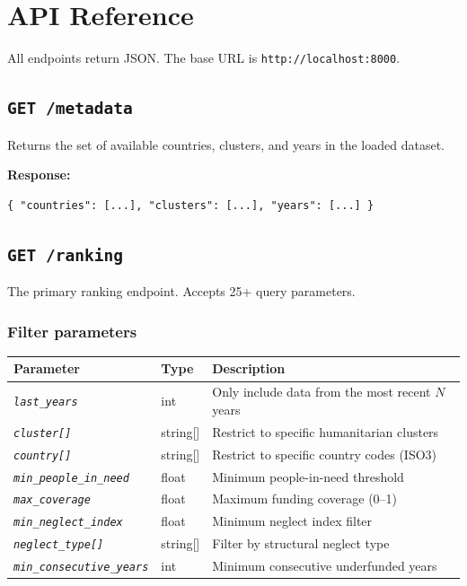 \documentclass[11pt,a4paper]{article}
\newcommand{\code}[1]{\texttt{#1}}
\newcommand{\apiendpoint}[1]{\texttt{\textcolor{ocha-blue}{#1}}}
\newcommand{\param}[1]{\texttt{\textit{#1}}}
\begin{document}
\section{API Reference}

All endpoints return JSON.  The base URL is \code{http://localhost:8000}.

\subsection{\apiendpoint{GET /metadata}}

Returns the set of available countries, clusters, and years in the loaded dataset.

\textbf{Response:}
\begin{lstlisting}[language={}]
{ "countries": [...], "clusters": [...], "years": [...] }
\end{lstlisting}

\subsection{\apiendpoint{GET /ranking}}

The primary ranking endpoint.  Accepts 25+ query parameters.

\subsubsection*{Filter parameters}

\begin{center}
  \begin{tabular}{lll}
    \toprule
    Parameter                       & Type     & Description                                      \\
    \midrule
    \param{last\_years}             & int      & Only include data from the most recent $N$ years \\
    \param{cluster[]}               & string[] & Restrict to specific humanitarian clusters       \\
    \param{country[]}               & string[] & Restrict to specific country codes (ISO3)        \\
    \param{min\_people\_in\_need}   & float    & Minimum people-in-need threshold                 \\
    \param{max\_coverage}           & float    & Maximum funding coverage (0--1)                  \\
    \param{min\_neglect\_index}     & float    & Minimum neglect index filter                     \\
    \param{neglect\_type[]}         & string[] & Filter by structural neglect type                \\
    \param{min\_consecutive\_years} & int      & Minimum consecutive underfunded years            \\
    \bottomrule
  \end{tabular}
\end{center}
\end{document}
